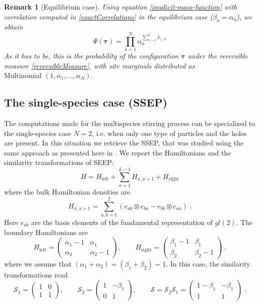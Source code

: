 \documentclass[10pt]{article}
\numberwithin{equation}{section}
\numberwithin{equation}{subsection}
\newtheorem{remark}{Remark}
\newcommand{\dt}{\;.}
\begin{document}
\begin{remark}[Equilibrium case]
	Using equation \eqref{implicit-mass-function} with correlation computed in \eqref{exactCorrelations} in the equilibrium case ($\beta_{a}=\alpha_{a}$), we obtain 
	\begin{equation}
		\Psi(\bm{\tau})=\prod_{a=1}^{N}\alpha_{a}^{\sum_{x=1}^{L}\delta_{\tau_{x},a}}
	\end{equation}
As it has to be, this is the probability of the configuration $\bm{\tau}$ under the reversible measure \eqref{reversibleMeasure}, with site marginals distributed as $\text{Multinomial }(1,\alpha_{1},\ldots,\alpha_{N})$. 
\end{remark}
\subsection{The single-species case (SSEP)}
The computations made for the multispecies stirring process can be specialized to the single-species case $N=2$, {i.e. when only one type of particles and the holes are present.} In this situation we retrieve the SSEP, that was studied using the same approach as presented here in \cite{frassek2020eigenstates}. We report the Hamiltonians and the similarity transformations of SEEP: 
\begin{equation}
	H=H_{\text{left}}+\sum_{x=1}^{L-1}H_{x,x+1}+H_{\text{right}}
\end{equation}
where the bulk Hamiltonian densities are 
\begin{equation}
	H_{x,x+1}=\sum_{a,b=1}^{2}\left(e_{ab}\otimes e_{ba}-e_{bb}\otimes e_{aa}\right)\dt
\end{equation}
Here $e_{ab}$ are the basis elements of the fundamental representation of $gl(2)$. The boundary Hamiltonians are
\begin{equation}
	H_{\text{left}}=\begin{pmatrix}
		\alpha_{1}-1&\alpha_{1}\\
		\alpha_{2}&\alpha_{2}-1
	\end{pmatrix},\qquad H_{\text{right}}=\begin{pmatrix}
	\beta_{1}-1&\beta_{1}\\
	\beta_{2}&\beta_{2}-1
\end{pmatrix}\dt
\end{equation} 
where we assume that $(\alpha_{1}+\alpha_{2})=(\beta_{1}+\beta_{2})=1$. In this case, the similarity transformations read
\begin{equation}
	\mathcal{S}_{1}=\begin{pmatrix}
		1&0\\
		1&1
	\end{pmatrix},\qquad \mathcal{S}_{2}=\begin{pmatrix}
	1&-\beta_{1}\\
	0&1
\end{pmatrix},\qquad \mathcal{S}=\mathcal{S}_{2}\mathcal{S}_{1}=\begin{pmatrix}
1-\beta_{1}&-\beta_{1}\\
1&1
\end{pmatrix}\dt
\end{equation}
\end{document}
